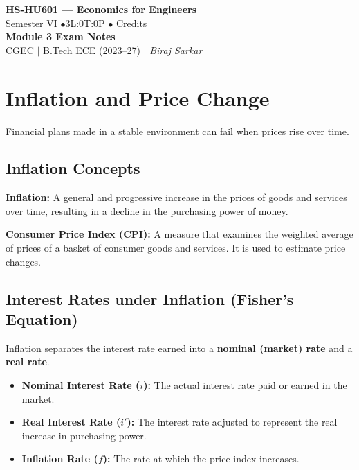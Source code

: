 \documentclass[12pt,a4paper]{article}
\begin{document}

\begin{center}
  {\LARGE\bfseries\color{myred} HS-HU601 --- Economics for Engineers}\\[5pt]
  {\normalsize\color{mydark} Semester VI \quad$\bullet$\quad 3L:0T:0P \quad$\bullet$ Credits}\\[3pt]
  {\normalsize\color{myteal}\textbf{Module 3 Exam Notes}}\\[3pt]
  {\small\color{mydark} CGEC \;$|$\; B.Tech ECE (2023--27) \;$|$\; \textit{Biraj Sarkar}}
\end{center}
\vspace{2pt}
\noindent{\color{myred}\rule{\linewidth}{1.5pt}}
\vspace{2pt}

\hypersetup{linkcolor=mydark}
\tableofcontents
\hypersetup{linkcolor=myteal}
\newpage

\section{Inflation and Price Change}

Financial plans made in a stable environment can fail when prices rise over time.

\subsection{Inflation Concepts}
\begin{tcolorbox}[defbox]
\textbf{Inflation:} A general and progressive increase in the prices of goods and services over time, resulting in a decline in the purchasing power of money.
\par\vspace{3pt}
\textbf{Consumer Price Index (CPI):} A measure that examines the weighted average of prices of a basket of consumer goods and services. It is used to estimate price changes.
\end{tcolorbox}

\subsection{Interest Rates under Inflation (Fisher's Equation)}
Inflation separates the interest rate earned into a \textbf{nominal (market) rate} and a \textbf{real rate}.
\begin{itemize}[leftmargin=*, itemsep=4pt]
  \item \textbf{Nominal Interest Rate ($i$):} The actual interest rate paid or earned in the market.
  \item \textbf{Real Interest Rate ($i'$):} The interest rate adjusted to represent the real increase in purchasing power.
  \item \textbf{Inflation Rate ($f$):} The rate at which the price index increases.
\end{itemize}
\end{document}

